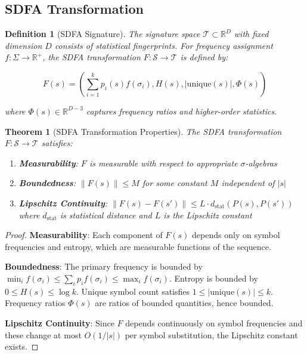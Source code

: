 \documentclass[11pt]{article}
\newtheorem{definition}{Definition}
\newtheorem{theorem}{Theorem}
\newcommand{\sdfa}{\textsc{SDFA}}
\newcommand{\seqspace}{\mathcal{S}}
\newcommand{\sigspace}{\mathcal{T}}
\newcommand{\alphabet}{\Sigma}
\newcommand{\entropy}[1]{H(#1)}
\newcommand{\prob}[1]{P(#1)}
\newcommand{\real}{\mathbb{R}}
\begin{document}
\subsection{SDFA Transformation}

\begin{definition}[SDFA Signature]
The signature space $\sigspace \subset \real^D$ with fixed dimension $D$ consists of statistical fingerprints. For frequency assignment $f: \alphabet \to \real^+$, the \sdfa{} transformation $F: \seqspace \to \sigspace$ is defined by:

\[F(s) = \left( \sum_{i=1}^k p_i(s) f(\sigma_i), \entropy{s}, |\text{unique}(s)|, \Phi(s) \right)\]

where $\Phi(s) \in \real^{D-3}$ captures frequency ratios and higher-order statistics.
\end{definition}

\begin{theorem}[SDFA Transformation Properties]
The \sdfa{} transformation $F: \seqspace \to \sigspace$ satisfies:
\begin{enumerate}
    \item \textbf{Measurability}: $F$ is measurable with respect to appropriate $\sigma$-algebras
    \item \textbf{Boundedness}: $\|F(s)\| \leq M$ for some constant $M$ independent of $|s|$
    \item \textbf{Lipschitz Continuity}: $\|F(s) - F(s')\| \leq L \cdot d_{\text{stat}}(\prob{s}, \prob{s'})$ where $d_{\text{stat}}$ is statistical distance and $L$ is the Lipschitz constant
\end{enumerate}
\end{theorem}

\begin{proof}
\textbf{Measurability}: Each component of $F(s)$ depends only on symbol frequencies and entropy, which are measurable functions of the sequence.

\textbf{Boundedness}: The primary frequency is bounded by $\min_i f(\sigma_i) \leq \sum_i p_i f(\sigma_i) \leq \max_i f(\sigma_i)$. Entropy is bounded by $0 \leq H(s) \leq \log k$. Unique symbol count satisfies $1 \leq |\text{unique}(s)| \leq k$. Frequency ratios $\Phi(s)$ are ratios of bounded quantities, hence bounded.

\textbf{Lipschitz Continuity}: Since $F$ depends continuously on symbol frequencies and these change at most $O(1/|s|)$ per symbol substitution, the Lipschitz constant exists.
\end{proof}
\end{document}
